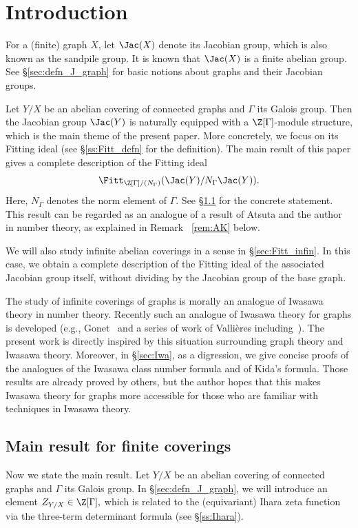 \section{Introduction}\label{sec:intro}

For a (finite) graph $X$, let $\Jac(X)$ denote its Jacobian group, which is also known as the sandpile group.
It is known that $\Jac(X)$ is a finite abelian group.
See \S\ref{sec:defn_J_graph} for basic notions about graphs and their Jacobian groups.

Let $Y/X$ be an abelian covering of connected graphs and $\Gamma$ its Galois group.
Then the Jacobian group $\Jac(Y)$ is naturally equipped with a $\Z[\Gamma]$-module structure, which is the main theme of the present paper.
More concretely, we focus on its Fitting ideal (see \S\ref{ss:Fitt_defn} for the definition).
The main result of this paper gives a complete description of the Fitting ideal
\[
\Fitt_{\Z[\Gamma]/(N_{\Gamma})}(\Jac(Y)/N_{\Gamma}\Jac(Y)).
\]
Here, $N_{\Gamma}$ denotes the norm element of $\Gamma$.
See \S\ref{ss:main_result} for the concrete statement.
This result can be regarded as an analogue of a result of Atsuta and the author~\cite{AK21} in number theory, as explained in Remark ~\ref{rem:AK} below.

We will also study infinite abelian coverings in a sense in \S\ref{sec:Fitt_infin}.
In this case, we obtain a complete description of the Fitting ideal of the associated Jacobian group itself, without dividing by the Jacobian group of the base graph.

The study of infinite coverings of graphs is morally an analogue of Iwasawa theory in number theory.
Recently such an analogue of Iwasawa theory for graphs is developed (e.g., Gonet~\cite{Gon22} and a series of work of Valli\`{e}res including~\cite{MV21b}).
The present work is directly inspired by this situation surrounding graph theory and Iwasawa theory.
Moreover, in \S\ref{sec:Iwa}, as a digression, we give concise proofs of the analogues of the Iwasawa class number formula and of Kida's formula.
Those results are already proved by others, but the author hopes that this makes Iwasawa theory for graphs more accessible for those who are familiar with techniques in Iwasawa theory.

\subsection{Main result for finite coverings}\label{ss:main_result}

Now we state the main result.
Let $Y/X$ be an abelian covering of connected graphs and $\Gamma$ its Galois group.
In \S\ref{sec:defn_J_graph}, we will introduce an element
$
Z_{Y/X} \in \Z[\Gamma],
$
which is related to the (equivariant) Ihara zeta function via the three-term determinant formula (see \S\ref{ss:Ihara}).

